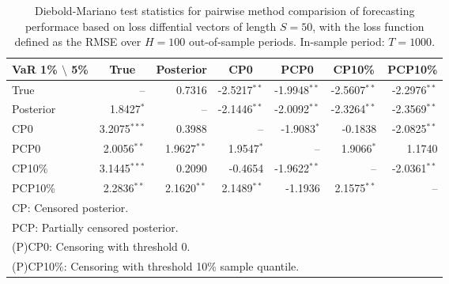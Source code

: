 { \renewcommand{\arraystretch}{1.2} 
\begin{table}[!ht] 
\center 
\begin{tabular}{l | rrr rrr} 
VaR 1\% $\setminus$ 5\% & \multicolumn{1}{c}{True} & \multicolumn{1}{c}{Posterior} & \multicolumn{1}{c}{CP0} & \multicolumn{1}{c}{PCP0} & \multicolumn{1}{c}{CP10\%} & \multicolumn{1}{c}{PCP10\%} \\ \hline 
True &    --\phantom{$^{***}$} & 0.7316\phantom{$^{***}$} & -2.5217$^{**}$\phantom{$^{*}$} & -1.9948$^{**}$\phantom{$^{*}$} & -2.5607$^{**}$\phantom{$^{*}$} & -2.2976$^{**}$\phantom{$^{*}$}  \\ 
Posterior & 1.8427$^{*}$\phantom{$^{**}$} &    --\phantom{$^{***}$} & -2.1446$^{**}$\phantom{$^{*}$} & -2.0092$^{**}$\phantom{$^{*}$} & -2.3264$^{**}$\phantom{$^{*}$} & -2.3569$^{**}$\phantom{$^{*}$}  \\ 
CP0 & 3.2075$^{***}$ & 0.3988\phantom{$^{***}$} &    --\phantom{$^{***}$} & -1.9083$^{*}$\phantom{$^{**}$} & -0.1838\phantom{$^{***}$} & -2.0825$^{**}$\phantom{$^{*}$}  \\ 
PCP0 & 2.0056$^{**}$\phantom{$^{*}$} & 1.9627$^{**}$\phantom{$^{*}$} & 1.9547$^{*}$\phantom{$^{**}$} &    --\phantom{$^{***}$} & 1.9066$^{*}$\phantom{$^{**}$} & 1.1740\phantom{$^{***}$}  \\ 
CP10\% & 3.1445$^{***}$ & 0.2090\phantom{$^{***}$} & -0.4654\phantom{$^{***}$} & -1.9622$^{**}$\phantom{$^{*}$} &    --\phantom{$^{***}$} & -2.0361$^{**}$\phantom{$^{*}$}  \\ 
PCP10\% & 2.2836$^{**}$\phantom{$^{*}$} & 2.1620$^{**}$\phantom{$^{*}$} & 2.1489$^{**}$\phantom{$^{*}$} & -1.1936\phantom{$^{***}$} & 2.1575$^{**}$\phantom{$^{*}$} &    --\phantom{$^{***}$}  \\ 
\hline 
\multicolumn{7}{l}{\footnotesize{CP: Censored posterior.}}  \\ 
\multicolumn{7}{l}{\footnotesize{PCP: Partially censored posterior.}} \\ 
\multicolumn{7}{l}{\footnotesize{(P)CP0: Censoring with threshold 0.}} \\ 
\multicolumn{7}{l}{\footnotesize{(P)CP10\%: Censoring with threshold 10\% sample quantile.}}  \\ 
\end{tabular}
 \caption{Diebold-Mariano test statistics for  pairwise method comparision of forecasting performace based on loss diffential vectors of length $S = 50$, with the loss function defined as the RMSE over $H=100$ out-of-sample periods. In-sample period: $T = 1000$.} 
\label{tab:garch11_DM_T_1000}  
\end{table}
}